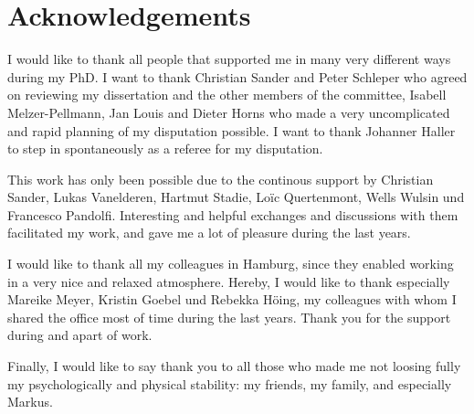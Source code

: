 \chapter*{Acknowledgements}
\vspace{1cm}

I would like to thank all people that supported me in many very different ways during my PhD.
I want to thank Christian Sander and Peter Schleper who agreed on reviewing my dissertation 
and the other members of the committee, Isabell Melzer-Pellmann, Jan Louis and Dieter Horns who made a very uncomplicated and rapid planning of my disputation possible.
I want to thank Johanner Haller to step in spontaneously as a referee for my disputation.

This work has only been possible due to the continous support by Christian Sander, Lukas Vanelderen, Hartmut Stadie, Lo\"{i}c Quertenmont, Wells Wulsin und Francesco Pandolfi.
Interesting and helpful exchanges and discussions with them facilitated my work, and gave me a lot of pleasure during the last years. 

I would like to thank all my colleagues in Hamburg, since they enabled working in a very nice and relaxed atmosphere. 
Hereby, I would like to thank especially Mareike Meyer, Kristin Goebel und Rebekka H\"{o}ing, my colleagues with whom I shared the office most of time during the last years. 
Thank you for the support during and apart of work.

Finally, I would like to say thank you to all those who made me not loosing fully my psychologically and physical stability: my friends, my family, and especially Markus.







